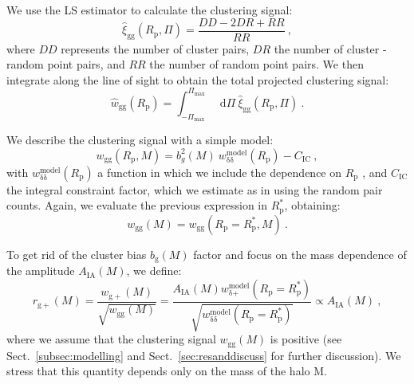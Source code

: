 \documentclass[a4paper,fleqn,usenatbib]{mnras}
\newcommand*\dif{\mathop{}\!\mathrm{d}} 	%
\begin{document}
We use the LS \citep{LandySzalay1993} estimator to calculate the clustering signal:
\begin{equation}
    \hat{\xi}_{\mathrm{gg}}(R_{\mathrm{p}}, \Pi) = \frac{DD -2DR + RR}{RR} \ ,
	\label{eq:xigghat}
\end{equation}
where $DD$ represents the number of cluster pairs, $DR$ the number of cluster - random point pairs, and $RR$ the number of random point pairs. We then integrate along the line of sight to obtain the total projected clustering signal:
\begin{equation}
   \hat{w}_{\mathrm{gg}} (R_{\mathrm{p}}) = \int _{-\Pi_{\mathrm{max}}}^{\Pi_{\mathrm{max}}} \dif \Pi \ \hat{\xi}_{\mathrm{gg}}(R_{\mathrm{p}}, \Pi) \ .
	\label{eq:wgghat}
\end{equation}

We describe the clustering signal with a simple model:
\begin{equation}
    w_{\mathrm{gg}} (R_{\mathrm{p}}, M)=b_g^2 (M)\ w_{\mathrm{\delta} \mathrm{\delta}}^{\mathrm{model}} (R_{\mathrm{p}}) - C_{\mathrm{IC}} \ , 
	\label{eq:wgg}
\end{equation}
with $w_{\mathrm{\delta} \mathrm{\delta}}^{\mathrm{model}} (R_{\mathrm{p}})$ a function in which we include the dependence on $R_{\mathrm{p}}$ \citep[equation 9]{vanUitertJoachimi2017}, and $C_{\mathrm{IC}}$ the integral constraint factor, which we estimate as in \citet[equation 8]{RocheEales1999} using the random pair counts. Again, we evaluate the previous expression in $R_{\mathrm{p}}^*$, obtaining:
\begin{equation}
    w_{\mathrm{gg}} (M)= w_{\mathrm{gg}} (R_{\mathrm{p}} = R_{\mathrm{p}}^*, M) \ .
	\label{eq:wgpmass}
\end{equation}

To get rid of the cluster bias $b_{\mathrm{g}} (M)$ factor and focus on the mass dependence of the amplitude $A_{\mathrm{IA}} (M)$, we define:
\begin{equation}
    r_{\mathrm{g+}} (M)=\frac{w_{\mathrm{g+}} (M)}{\sqrt{w_{\mathrm{gg}} (M)}} =\frac{A_{\mathrm{IA}} (M) w_{\mathrm{\delta} \mathrm{+}}^{\mathrm{model}} (R_{\mathrm{p}} = R_{\mathrm{p}}^*) }{\sqrt{w_{\mathrm{\delta} \mathrm{\delta}}^{\mathrm{model}} (R_{\mathrm{p}}=R_{\mathrm{p}}^*)}} \propto A_{\mathrm{IA}} (M) \ ,
	\label{eq:rg+}
\end{equation}
where we assume that the clustering signal $w_{\mathrm{gg}}(M)$ is positive (see Sect.~\ref{subsec:modelling} and Sect.~\ref{sec:resanddiscuss} for further discussion). We stress that this quantity depends only on the mass of the halo M.
\end{document}
